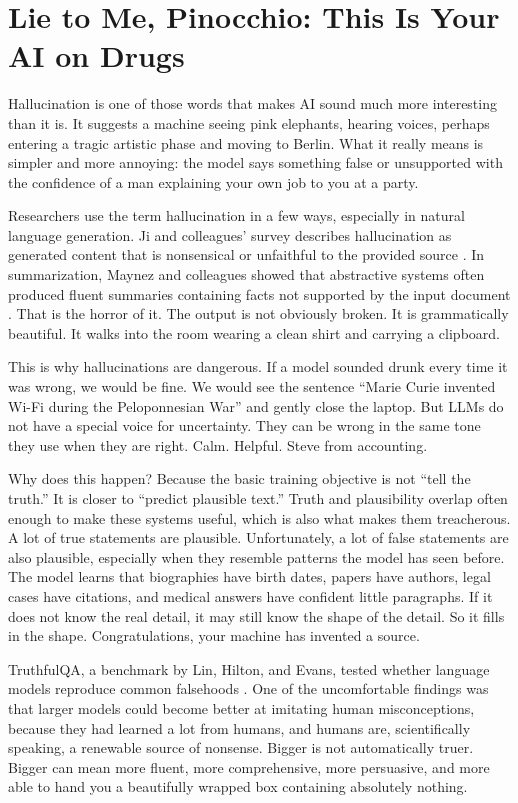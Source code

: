 \documentclass[12pt,oneside]{book}
\begin{document}
\chapter{Lie to Me, Pinocchio: This Is Your AI on Drugs}

Hallucination is one of those words that makes AI sound much more interesting than it is. It suggests a machine seeing pink elephants, hearing voices, perhaps entering a tragic artistic phase and moving to Berlin. What it really means is simpler and more annoying: the model says something false or unsupported with the confidence of a man explaining your own job to you at a party.

Researchers use the term hallucination in a few ways, especially in natural language generation. Ji and colleagues' survey describes hallucination as generated content that is nonsensical or unfaithful to the provided source \parencite{ji2023}. In summarization, Maynez and colleagues showed that abstractive systems often produced fluent summaries containing facts not supported by the input document \parencite{maynez2020}. That is the horror of it. The output is not obviously broken. It is grammatically beautiful. It walks into the room wearing a clean shirt and carrying a clipboard.

This is why hallucinations are dangerous. If a model sounded drunk every time it was wrong, we would be fine. We would see the sentence ``Marie Curie invented Wi-Fi during the Peloponnesian War'' and gently close the laptop. But LLMs do not have a special voice for uncertainty. They can be wrong in the same tone they use when they are right. Calm. Helpful. Steve from accounting.

Why does this happen? Because the basic training objective is not ``tell the truth.'' It is closer to ``predict plausible text.'' Truth and plausibility overlap often enough to make these systems useful, which is also what makes them treacherous. A lot of true statements are plausible. Unfortunately, a lot of false statements are also plausible, especially when they resemble patterns the model has seen before. The model learns that biographies have birth dates, papers have authors, legal cases have citations, and medical answers have confident little paragraphs. If it does not know the real detail, it may still know the shape of the detail. So it fills in the shape. Congratulations, your machine has invented a source.

TruthfulQA, a benchmark by Lin, Hilton, and Evans, tested whether language models reproduce common falsehoods \parencite{lin2022}. One of the uncomfortable findings was that larger models could become better at imitating human misconceptions, because they had learned a lot from humans, and humans are, scientifically speaking, a renewable source of nonsense. Bigger is not automatically truer. Bigger can mean more fluent, more comprehensive, more persuasive, and more able to hand you a beautifully wrapped box containing absolutely nothing.
\end{document}
